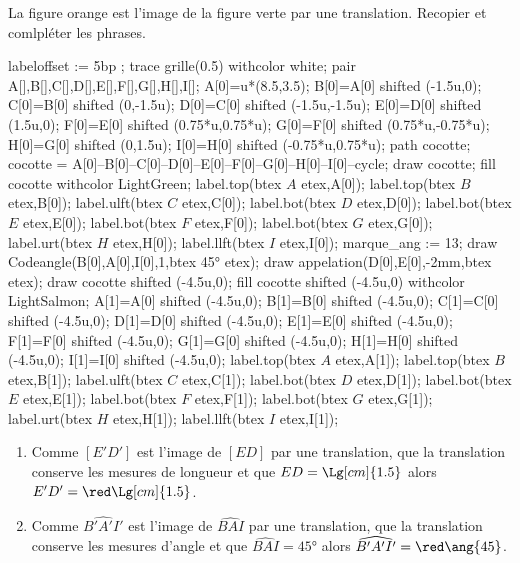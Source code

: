 \begin{corrige}
    La figure orange est l'image de la figure verte par une translation. Recopier et comlpléter les phrases.
    \begin{Geometrie}[CoinHD={(9u,4u)}]
        labeloffset := 5bp ;
        trace grille(0.5) withcolor white;
        pair A[],B[],C[],D[],E[],F[],G[],H[],I[];
        A[0]=u*(8.5,3.5);
        B[0]=A[0] shifted (-1.5u,0);
        C[0]=B[0] shifted (0,-1.5u);
        D[0]=C[0] shifted (-1.5u,-1.5u);
        E[0]=D[0] shifted (1.5u,0);
        F[0]=E[0] shifted (0.75*u,0.75*u);
        G[0]=F[0] shifted (0.75*u,-0.75*u);
        H[0]=G[0] shifted (0,1.5u);
        I[0]=H[0] shifted (-0.75*u,0.75*u);
        path cocotte;
        cocotte = A[0]--B[0]--C[0]--D[0]--E[0]--F[0]--G[0]--H[0]--I[0]--cycle;
        draw cocotte;
        fill cocotte withcolor LightGreen;
        label.top(btex $A$ etex,A[0]);
        label.top(btex $B$ etex,B[0]);
        label.ulft(btex $C$ etex,C[0]);
        label.bot(btex $D$ etex,D[0]);
        label.bot(btex $E$ etex,E[0]);
        label.bot(btex $F$ etex,F[0]);
        label.bot(btex $G$ etex,G[0]);
        label.urt(btex $H$ etex,H[0]);
        label.llft(btex $I$ etex,I[0]);
        marque_ang := 13;
        draw Codeangle(B[0],A[0],I[0],1,btex \ang{45} etex);        
        draw appelation(D[0],E[0],-2mm,btex  etex);
        draw cocotte shifted (-4.5u,0);
        fill cocotte shifted (-4.5u,0) withcolor LightSalmon;
        A[1]=A[0] shifted (-4.5u,0);
        B[1]=B[0] shifted (-4.5u,0);
        C[1]=C[0] shifted (-4.5u,0);
        D[1]=D[0] shifted (-4.5u,0);
        E[1]=E[0] shifted (-4.5u,0);
        F[1]=F[0] shifted (-4.5u,0);
        G[1]=G[0] shifted (-4.5u,0);
        H[1]=H[0] shifted (-4.5u,0);
        I[1]=I[0] shifted (-4.5u,0);
        label.top(btex $A$ etex,A[1]);
        label.top(btex $B$ etex,B[1]);
        label.ulft(btex $C$ etex,C[1]);
        label.bot(btex $D$ etex,D[1]);
        label.bot(btex $E$ etex,E[1]);
        label.bot(btex $F$ etex,F[1]);
        label.bot(btex $G$ etex,G[1]);
        label.urt(btex $H$ etex,H[1]);
        label.llft(btex $I$ etex,I[1]);
    \end{Geometrie}
    \begin{enumerate}
        \item Comme {\red $[E'D']$ est l'image de $[ED]$ par une translation, que la translation conserve les mesures de longueur} et que $ED=\Lg[cm]{1.5}$ alors $E'D'={\red \Lg[cm]{1.5}}$.
        \item Comme {\red $\widehat{B'A'I'}$ est l'image de $\widehat{BAI}$ par une translation, que la translation conserve les mesures d'angle } et que $\widehat{BAI}=\ang{45}$ alors $\widehat{B'A'I'}={\red \ang{45}}$.
    \end{enumerate}
\end{corrige}

